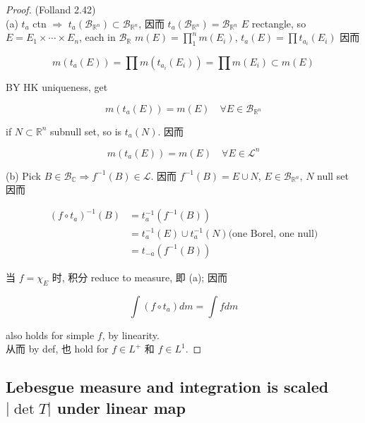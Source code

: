 \documentclass{qlnotes-export}
\begin{document}
\begin{proof}

(Folland 2.42)\\
(a) \(t_{a}\) ctn \(\Longrightarrow\) \(t_{a}(\mathcal{B}_{{\mathbb{R}}^{n}}) \subset \mathcal{B}_{{\mathbb{R}}^{n}}\), 因而 \(t_{a}(\mathcal{B}_{{\mathbb{R}}^{n}}) = \mathcal{B}_{{\mathbb{R}}^{n}}\) \(E\) rectangle, so \(E = E_{1} \times \cdots \times E_{n}\), each in \(\mathcal{B}_{\mathbb{R}}\) \(m(E) = \prod_{1}^{n}m(E_{i})\), \(t_{a}(E) = \prod t_{a_{i}}(E_{i})\) 因而

\[m(t_{a}(E)) = \prod m(t_{a_{i}}(E_{i})) = \prod m(E_{i}) \subset m(E)\]

BY HK uniqueness, get

\[m(t_{a}(E)) = m(E)\quad\forall E \in \mathcal{B}_{{\mathbb{R}}^{n}}\]

if \(N \subset {\mathbb{R}}^{n}\) subnull set, so is \(t_{a}(N)\). 因而

\[m(t_{a}(E)) = m(E)\quad\forall E \in \mathcal{L}^{n}\]

(b) Pick \(B \in \mathcal{B}_{\mathbb{C}}\Longrightarrow f^{- 1}(B) \in \mathcal{L}\). 因而 \(f^{- 1}(B) = E \cup N\), \(E \in \mathcal{B}_{{\mathbb{R}}^{n}}\), \(N\) null set 因而

\[\begin{matrix}
{(f \circ t_{a})^{- 1}(B)} & {= t_{a}^{- 1}(f^{- 1}(B))} \\
 & {= t_{a}^{- 1}(E) \cup t_{a}^{- 1}(N)\text{(one Borel, one null)}} \\
 & {= t_{- a}(f^{- 1}(B))}
\end{matrix}\]

当 \(f = \chi_{E}\) 时, 积分 reduce to measure, 即 (a); 因而

\[\int(f \circ t_{a}) dm = \int f dm\]

also holds for simple \(f\), by linearity.\\
从而 by def, 也 hold for \(f \in L^{+}\) 和 \(f \in L^{1}\).

\end{proof}

\subsection{\texorpdfstring{Lebesgue measure and integration is scaled \(|\det T|\) under linear map}{Lebesgue measure and integration is scaled \textbar\textbackslash det T\textbar{} under linear map}}\label{lebesgue-measure-and-integration-is-scaled-det-t-under-linear-map}
\end{document}
